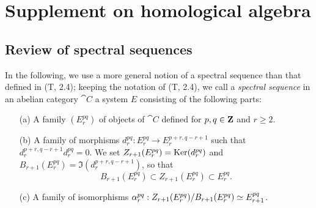 \section{Supplement on homological algebra}
\label{section:0.11}

\subsection{Review of spectral sequences}
\label{subsection:0.11.1}

\begin{env}[11.1.1]
\label{0.11.1.1}
In the following, we use a more general notion of a spectral sequence than that defined in (T, 2.4); keeping the notation of (T, 2.4), we call a \emph{spectral sequence} in an abelian category $\cat{C}$ a system $E$ consisting of the following parts:
\begin{enumerate}
  \item[(a)] A family $(E_r^{pq})$ of objects of $\cat{C}$ defined for $p,q\in\mathbf{Z}$ and $r\geq 2$.
  \item[(b)] A family of morphisms $d_r^{pq}:E_r^{pq}\to E_r^{p+r,q-r+1}$ such that $d_r^{p+r,q-r+1}d_r^{pq}=0$.
    We set $Z_{r+1}(E_r^{pq})=\operatorname{Ker}(d_r^{pq})$ and $B_{r+1}(E_r^{pq})=\Im(d_r^{p+r,q-r+1})$, so that
    \[
      B_{r+1}(E_r^{pq})\subset Z_{r+1}(E_r^{pq})\subset E_r^{pq}.
    \]
  \item[(c)] A family of isomorphisms $\alpha_r^{pq}:Z_{r+1}(E_r^{pq})/B_{r+1}(E_r^{pq})\simeq E_{r+1}^{pq}$.


\end{enumerate}
\end{env}
